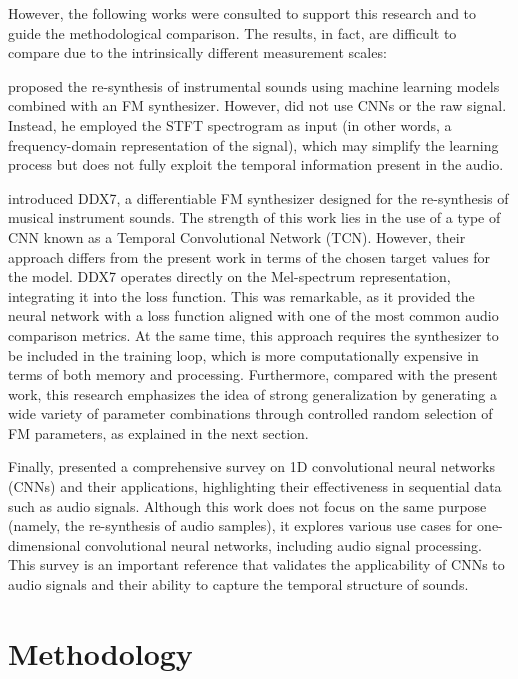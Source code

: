\documentclass[sigconf,natbib=false]{acmart}
\begin{document}
However, the following works were consulted to support this research and to guide the methodological comparison. The results, in fact, are difficult to compare due to the intrinsically different measurement scales:

\textcite{claesson2021resynthesis} proposed the re-synthesis of instrumental sounds using machine learning models combined with an FM synthesizer. However, \textcite{claesson2021resynthesis} did not use CNNs or the raw signal. Instead, he employed the STFT spectrogram as input (in other words, a frequency-domain representation of the signal), which may simplify the learning process but does not fully exploit the temporal information present in the audio.

\textcite{steinmetz2022ddx7} introduced DDX7, a differentiable FM synthesizer designed for the re-synthesis of musical instrument sounds. The strength of this work lies in the use of a type of CNN known as a Temporal Convolutional Network (TCN). However, their approach differs from the present work in terms of the chosen target values for the model. DDX7 operates directly on the Mel-spectrum representation, integrating it into the loss function. This was remarkable, as it provided the neural network with a loss function aligned with one of the most common audio comparison metrics. At the same time, this approach requires the synthesizer to be included in the training loop, which is more computationally expensive in terms of both memory and processing. Furthermore, compared with the present work, this research emphasizes the idea of strong generalization by generating a wide variety of parameter combinations through controlled random selection of FM parameters, as explained in the next section.

Finally, \textcite{kiranyaz2021survey} presented a comprehensive survey on 1D convolutional neural networks (CNNs) and their applications, highlighting their effectiveness in sequential data such as audio signals. Although this work does not focus on the same purpose (namely, the re-synthesis of audio samples), it explores various use cases for one-dimensional convolutional neural networks, including audio signal processing. This survey is an important reference that validates the applicability of CNNs to audio signals and their ability to capture the temporal structure of sounds.


\section{Methodology} \label{sec:our_proposal}
\end{document}
